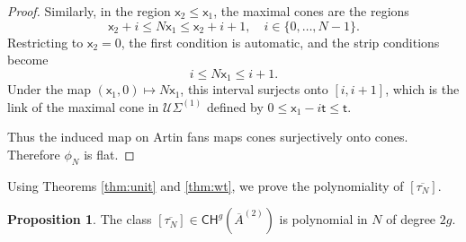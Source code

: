 \documentclass[11pt]{article}
\def\CH{\mathsf{CH}}
\newcommand{\barA}{\overline{A}}
\theoremstyle{definition}
\newtheorem{proposition}[definition]{Proposition}
\begin{document}
\begin{proof}
    Similarly, in the region $\mathsf{x}_2 \leq \mathsf{x}_1$, the maximal cones are the regions
    \[
    \mathsf{x}_2+i \leq N\mathsf{x}_1 \leq \mathsf{x}_2+i+1,
    \quad
    i \in \{0,\ldots,N-1\}.
    \]
    Restricting to $\mathsf{x}_2=0$, the first condition is automatic, and the strip conditions become
    \[
    i \leq N\mathsf{x}_1 \leq i+1.
    \]
    Under the map $(\mathsf{x}_1,0)\mapsto N\mathsf{x}_1$, this interval surjects onto $[i,i+1]$,
    which is the link of the maximal cone in $\mathcal U\Sigma^{(1)}$ defined by $0 \leq \mathsf{x}_1-i\mathsf{t} \leq \mathsf{t}$.

    Thus the induced map on Artin fans maps cones surjectively onto cones.
    Therefore $\phi_N$ is flat.
\end{proof}

Using Theorems \ref{thm:unit} and \ref{thm:wt}, we prove the polynomiality of $[\overline{\tau_N}]$.

\begin{proposition}\label{pro:poly}
    The class $[\overline{\tau_N}] \in \CH^g(\barA^{(2)})$ is polynomial in $N$ of degree $2g$.
\end{proposition}
\end{document}
